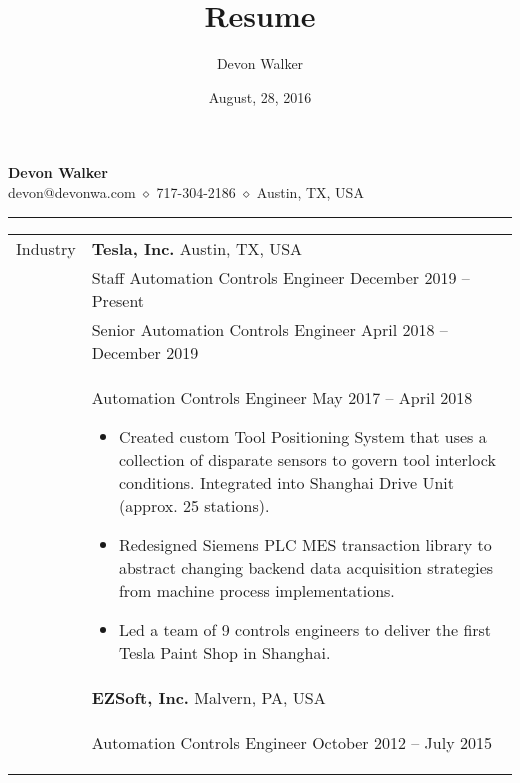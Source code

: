 \documentclass[11pt]{article}
\begin{document}
\title{Resume}
\author{Devon Walker}
\date{August, 28, 2016}

\thispagestyle{empty}
\pagestyle{empty}

\begin{center}
    {\LARGE\textbf{Devon Walker}} \\
    devon@devonwa.com $\diamond$ 717-304-2186 $\diamond$ Austin, TX, USA  \vspace{0.25\baselineskip} \hrule
\end{center}

\vspace{0.5\baselineskip}\noindent
\renewcommand{\arraystretch}{1}%
\begin{tabular}[t]{@{}p{1.05in} @{}p{6.00in}}

{Industry}
&
\textbf{Tesla, Inc.}  \hfill Austin, TX, USA\vspace{0.015in} \\ &
Staff Automation Controls Engineer \hfill December 2019 -- Present\vspace{0.015in}
        \\ &
Senior Automation Controls Engineer \hfill April 2018 -- December 2019\vspace{0.015in}
        \\ &
Automation Controls Engineer \hfill May 2017 -- April 2018\vspace{0.015in}
\begin{itemize}
    \renewcommand{\labelitemi}{$\diamond$}
    \item Created custom Tool Positioning System that uses a collection of disparate sensors to govern tool interlock conditions. Integrated into Shanghai Drive Unit (approx. 25 stations).%
    \item Redesigned Siemens PLC MES transaction library to abstract changing backend data acquisition strategies from machine process implementations.%
    \item Led a team of 9 controls engineers to deliver the first Tesla Paint Shop in Shanghai.%
\end{itemize}
\\
&
\textbf{EZSoft, Inc.}  \hfill Malvern, PA, USA\vspace{0.015in} \\ &
Automation Controls Engineer \hfill October 2012 -- July 2015\vspace{0.015in}
\begin{itemize}
    \renewcommand{\labelitemi}{$\diamond$}

\end{itemize}
\end{tabular}
\end{document}
